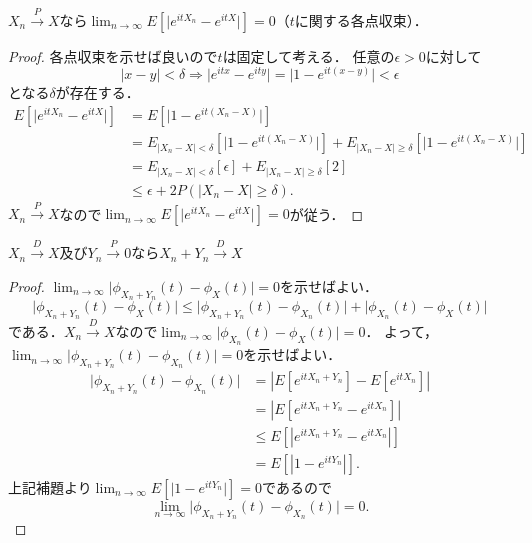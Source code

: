\begin{screen}
  \begin{lem}
    \(X_n \stackrel{P}{\to} X\)なら\(\lim_{n\to\infty} E[\lvert e^{itX_n} - e^{itX} \rvert] = 0\)（\(t\)に関する各点収束）．
  \end{lem}
\end{screen}
\begin{proof}
  各点収束を示せば良いので\(t\)は固定して考える．
  任意の\(\epsilon>0\)に対して
  \[ \lvert x-y \rvert < \delta \Rightarrow \lvert e^{itx} - e^{ity} \rvert
  = \lvert 1 - e^{it(x-y)} \rvert < \epsilon \]
  となる\(\delta\)が存在する．
  \begin{align*}
    E[\lvert e^{itX_n} - e^{itX} \rvert] &= E[\lvert 1 - e^{it(X_n-X)} \rvert] \\
    &= E_{\lvert X_n - X\rvert < \delta}[\lvert 1 - e^{it(X_n-X)} \rvert] + E_{\lvert X_n - X\rvert \geq \delta}[\lvert 1 - e^{it(X_n-X)} \rvert] \\
    &= E_{\lvert X_n - X\rvert < \delta}[\epsilon] + E_{\lvert X_n - X\rvert \geq \delta}[2] \\
    &\leq \epsilon + 2 P(\lvert X_n - X\rvert \geq \delta) .
  \end{align*}
  \(X_n \stackrel{P}{\to} X\)なので\(\lim_{n\to\infty} E[\lvert e^{itX_n} - e^{itX} \rvert] = 0\)が従う．
\end{proof}

\begin{screen}
  \(X_n \stackrel{D}{\to} X\)及び\(Y_n \stackrel{P}{\to} 0\)なら\(X_n+Y_n \stackrel{D}{\to} X\)
\end{screen}
\begin{proof}
  \(\lim_{n\to\infty}\lvert \phi_{X_n+Y_n}(t) - \phi_X(t) \rvert = 0\)を示せばよい．
  \[  \lvert \phi_{X_n+Y_n}(t) - \phi_X(t) \rvert
  \leq \lvert \phi_{X_n+Y_n}(t) - \phi_{X_n}(t) \rvert + \lvert \phi_{X_n}(t) - \phi_X(t) \rvert \]
  である．\(X_n \stackrel{D}{\to} X\)なので\(\lim_{n\to\infty}\lvert \phi_{X_n}(t) - \phi_X(t) \rvert = 0\)．
  よって，\(\lim_{n\to\infty}\lvert \phi_{X_n+Y_n}(t) - \phi_{X_n}(t) \rvert = 0\)を示せばよい．
  \begin{align*}
    \lvert \phi_{X_n+Y_n}(t) - \phi_{X_n}(t) \rvert
    &= \left\lvert E[e^{it{X_n+Y_n}}] - E[e^{itX_n}] \right\rvert \\
    &= \left\lvert E[e^{it{X_n+Y_n}} - e^{itX_n}] \right\rvert \\
    &\leq E\left[ \left\lvert e^{it{X_n+Y_n}} - e^{itX_n} \right\rvert \right] \\
    &= E\left[ \left\lvert 1 - e^{itY_n} \right\rvert \right] .
  \end{align*}
  上記補題より\(\lim_{n\to\infty} E[\lvert 1 - e^{itY_n} \rvert] = 0\)であるので
  \[ \lim_{n\to\infty}\lvert \phi_{X_n+Y_n}(t) - \phi_{X_n}(t) \rvert = 0 . \]
\end{proof}

